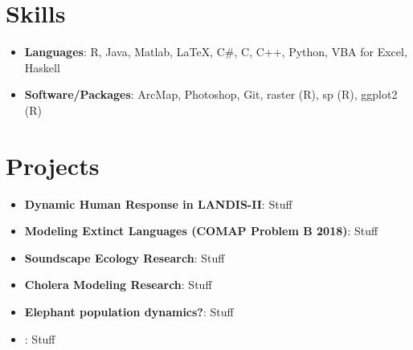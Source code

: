 \documentclass[letterpaper,10pt]{article}
\newcommand{\resumeItem}[2]{
  \item\small{
    \textbf{#1}{: #2 \vspace{-2pt}}
  }
}
\newcommand{\resumeSubItem}[2]{\resumeItem{#1}{#2}\vspace{-4pt}}
\newcommand{\resumeSubHeadingListStart}{\begin{itemize}[label=\null,leftmargin=*]}
\newcommand{\resumeSubHeadingListEnd}{\end{itemize}}
\begin{document}
\section{Skills}
 \resumeSubHeadingListStart
    \item{
     \textbf{Languages}{: R, Java, Matlab, LaTeX, C\#, C, C++, Python, VBA for Excel, Haskell}
     \hfill
    }
    \vspace{-2.5mm}
    \item{
    \textbf{Software/Packages}{: ArcMap, Photoshop, Git, raster (R), sp (R), ggplot2 (R)}
    \hfill
    }
 \resumeSubHeadingListEnd


\newpage
 

\section{Projects}
	\resumeSubHeadingListStart
		\resumeSubItem{Dynamic Human Response in LANDIS-II}
			{Stuff}
		\resumeSubItem{Modeling Extinct Languages (COMAP Problem B 2018)}
			{Stuff}
		\resumeSubItem{Soundscape Ecology Research}
			{Stuff}
		\resumeSubItem{Cholera Modeling Research}
			{Stuff}
		\resumeSubItem{Elephant population dynamics?}
			{Stuff}
		\resumeSubItem{}
			{Stuff}
		
	\resumeSubHeadingListEnd


\end{document}
